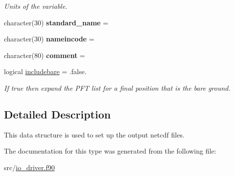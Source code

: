 \begin{DoxyCompactItemize}
\begin{DoxyCompactList}\small\item\em Units of the variable. \end{DoxyCompactList}\item 
\hypertarget{structio__driver_1_1infopak_a5766c0c8823b3bfefa9244272768d60b}{}character(30) {\bfseries standard\+\_\+name} = \textquotesingle{} \textquotesingle{}\label{structio__driver_1_1infopak_a5766c0c8823b3bfefa9244272768d60b}

\item 
\hypertarget{structio__driver_1_1infopak_ac43a61c3ae36da9579fdbeec53d0a3f3}{}character(30) {\bfseries nameincode} = \textquotesingle{} \textquotesingle{}\label{structio__driver_1_1infopak_ac43a61c3ae36da9579fdbeec53d0a3f3}

\item 
\hypertarget{structio__driver_1_1infopak_a48c1a2ee7a3c6f1f9b15ed34ec23983a}{}character(80) {\bfseries comment} = \textquotesingle{} \textquotesingle{}\label{structio__driver_1_1infopak_a48c1a2ee7a3c6f1f9b15ed34ec23983a}

\item 
\hypertarget{structio__driver_1_1infopak_a61926ac0a514d12e36d83b5221680820}{}logical \hyperlink{structio__driver_1_1infopak_a61926ac0a514d12e36d83b5221680820}{includebare} = .false.\label{structio__driver_1_1infopak_a61926ac0a514d12e36d83b5221680820}

\begin{DoxyCompactList}\small\item\em If true then expand the P\+F\+T list for a final position that is the bare ground. \end{DoxyCompactList}\end{DoxyCompactItemize}


\subsection{Detailed Description}
This data structure is used to set up the output netcdf files. 

The documentation for this type was generated from the following file\+:\begin{DoxyCompactItemize}
\item 
src/\hyperlink{io__driver_8f90}{io\+\_\+driver.\+f90}\end{DoxyCompactItemize}
